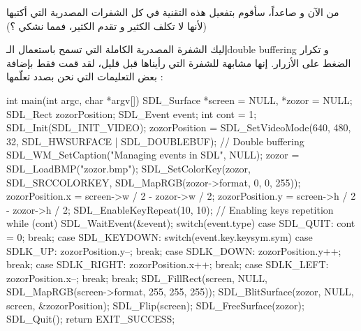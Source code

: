 من الآن و صاعداً، سأقوم بتفعيل هذه التقنية في كل الشفرات المصدرية التي أكتبها (لأنها لا تكلف الكثير و تقدم الكثير، فمما نشكي ؟)

إليك الشفرة المصدرية الكاملة التي تسمح باستعمال الـ\textenglish{double buffering}
و تكرار الضغط على الأزرار. إنها مشابهة للشفرة التي رأيناها قبل قليل، لقد قمت فقط بإضافة بعض التعليمات التي نحن بصدد تعلّمها :

\begin{Csource}
int main(int argc, char *argv[])
{
	SDL_Surface *screen = NULL, *zozor = NULL;
	SDL_Rect zozorPosition;
	SDL_Event event;
	int cont = 1;
	SDL_Init(SDL_INIT_VIDEO);
	zozorPosition = SDL_SetVideoMode(640, 480, 32, SDL_HWSURFACE | SDL_DOUBLEBUF); // Double buffering
	SDL_WM_SetCaption("Managing events in SDL", NULL);
	zozor = SDL_LoadBMP("zozor.bmp");
	SDL_SetColorKey(zozor, SDL_SRCCOLORKEY, SDL_MapRGB(zozor->format, 0, 0, 255));
	zozorPosition.x = screen->w / 2 - zozor->w / 2;
	zozorPosition.y = screen->h / 2 - zozor->h / 2;
	SDL_EnableKeyRepeat(10, 10); // Enabling keys repetition
	while (cont)
	{
		SDL_WaitEvent(&event);
		switch(event.type)
		{
			case SDL_QUIT:
			cont = 0;
			break;
			case SDL_KEYDOWN:
			switch(event.key.keysym.sym)
			{
				case SDLK_UP:
				zozorPosition.y--;
				break;
				case SDLK_DOWN:
				zozorPosition.y++;
				break;
				case SDLK_RIGHT:
				zozorPosition.x++;
				break;
				case SDLK_LEFT:
				zozorPosition.x--;
				break;
			}
			break;
		}
		SDL_FillRect(screen, NULL, SDL_MapRGB(screen->format, 255, 255, 255));
		SDL_BlitSurface(zozor, NULL, screen, &zozorPosition);
		SDL_Flip(screen);
	}
	SDL_FreeSurface(zozor);
	SDL_Quit();
	return EXIT_SUCCESS;
}
\end{Csource}
